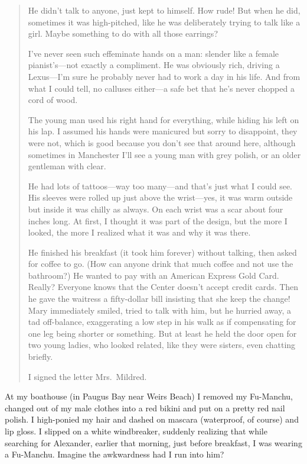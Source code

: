 \begin{quote}
He didn't talk to anyone, just kept to himself. How rude! But when he
did, sometimes it was high-pitched, like he was deliberately trying to
talk like a girl. Maybe something to do with all those earrings?

I've never seen such effeminate hands on a man: slender like a female
pianist's---not exactly a compliment. He was obviously rich, driving a
Lexus---I'm sure he probably never had to work a day in his life. And
from what I could tell, no calluses either---a safe bet that he's never
chopped a cord of wood.

The young man used his right hand for everything, while hiding his left
on his lap. I assumed his hands were manicured but sorry to disappoint,
they were not, which is good because you don't see that around here,
although sometimes in Manchester I'll see a young man with grey polish,
or an older gentleman with clear.

He had lots of tattoos---way too many---and that's just what I could
see. His sleeves were rolled up just above the wrist---yes, it was warm
outside but inside it was chilly as always. On each wrist was a scar
about four inches long. At first, I thought it was part of the design,
but the more I looked, the more I realized what it was and why it was
there.

He finished his breakfast (it took him forever) without talking, then
asked for coffee to go. (How can anyone drink that much coffee and not
use the bathroom?) He wanted to pay with an American Express Gold Card.
Really? Everyone knows that the Center doesn't accept credit cards. Then
he gave the waitress a fifty-dollar bill insisting that she keep the
change! Mary immediately smiled, tried to talk with him, but he hurried
away, a tad off-balance, exaggerating a low step in his walk as if
compensating for one leg being shorter or something. But at least he
held the door open for two young ladies, who looked related, like they
were sisters, even chatting briefly.

I signed the letter Mrs.~Mildred.
\end{quote}

\noindent At my boathouse (in Paugus Bay near Weirs Beach) I removed my
Fu-Manchu, changed out of my male clothes into a red bikini and put on a
pretty red nail polish. I high-ponied my hair and dashed on mascara
(waterproof, of course) and lip gloss. I slipped on a white windbreaker,
suddenly realizing that while searching for Alexander, earlier that
morning, just before breakfast, I was wearing a Fu-Manchu. Imagine the
awkwardness had I run into him?

